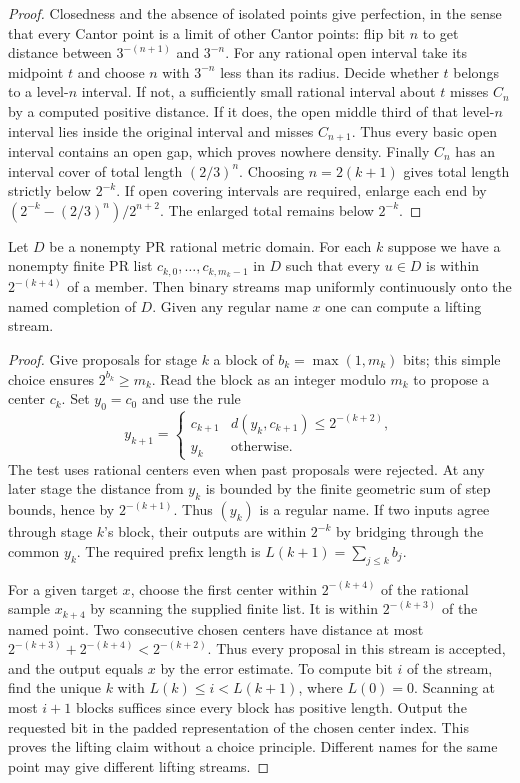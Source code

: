 \begin{proof}
Closedness and the absence of isolated points give perfection, in the
sense that every Cantor point is a limit of other Cantor points: flip
bit $n$ to get distance between $3^{-(n+1)}$ and $3^{-n}$.
For any rational open interval take its midpoint $t$ and choose $n$
with $3^{-n}$ less than its radius. Decide whether $t$ belongs to a
level-$n$ interval. If not, a sufficiently small rational interval about
$t$ misses $C_n$ by a computed positive distance. If it does, the open
middle third of that level-$n$ interval lies inside the original interval
and misses $C_{n+1}$. Thus every basic open interval contains an open gap,
which proves nowhere density. Finally $C_n$ has an interval cover of total
length $(2/3)^n$. Choosing $n=2(k+1)$ gives total length strictly below
$2^{-k}$. If open covering intervals are required, enlarge each end by
$(2^{-k}-(2/3)^n)/2^{n+2}$. The enlarged total remains below $2^{-k}$.
\end{proof}

\begin{theorem}\label{idx-cantor144}
Let $D$ be a nonempty PR rational metric domain. For each $k$ suppose
we have a nonempty finite PR list $c_{k,0},\ldots,c_{k,m_k-1}$ in $D$
such that every $u\in D$ is within $2^{-(k+4)}$ of a member.
Then binary streams map uniformly continuously onto the named completion
of $D$. Given any regular name $x$ one can compute a lifting stream.
\end{theorem}
\begin{proof}
Give proposals for stage $k$ a block of $b_k=\max(1,m_k)$ bits; this
simple choice ensures $2^{b_k}\ge m_k$. Read the block as an integer
modulo $m_k$ to propose a center $c_k$. Set $y_0=c_0$ and use the rule
\[
 y_{k+1}=\begin{cases}
 c_{k+1}&d(y_k,c_{k+1})\le2^{-(k+2)},\\
 y_k&\text{otherwise}.
 \end{cases}
\]
The test uses rational centers even when past proposals were rejected.
At any later stage the distance from $y_k$ is bounded by the finite
geometric sum of step bounds, hence by $2^{-(k+1)}$. Thus $(y_k)$
is a regular name. If two inputs agree through stage $k$'s block,
their outputs are within $2^{-k}$ by bridging through the common
$y_k$. The required prefix length is $L(k+1)=\sum_{j\le k}b_j$.

For a given target $x$, choose the first center within $2^{-(k+4)}$ of
the rational sample $x_{k+4}$ by scanning the supplied finite list.
It is within $2^{-(k+3)}$ of the named point. Two consecutive chosen
centers have distance at most $2^{-(k+3)}+2^{-(k+4)}<2^{-(k+2)}$.
Thus every proposal in this stream is accepted, and the output equals
$x$ by the error estimate. To compute bit $i$ of the stream, find the
unique $k$ with $L(k)\le i<L(k+1)$, where $L(0)=0$. Scanning at most
$i+1$ blocks suffices since every block has positive length. Output
the requested bit in the padded representation of the chosen center
index. This proves the lifting claim without a choice principle.
Different names for the same point may give different lifting streams.
\end{proof}

